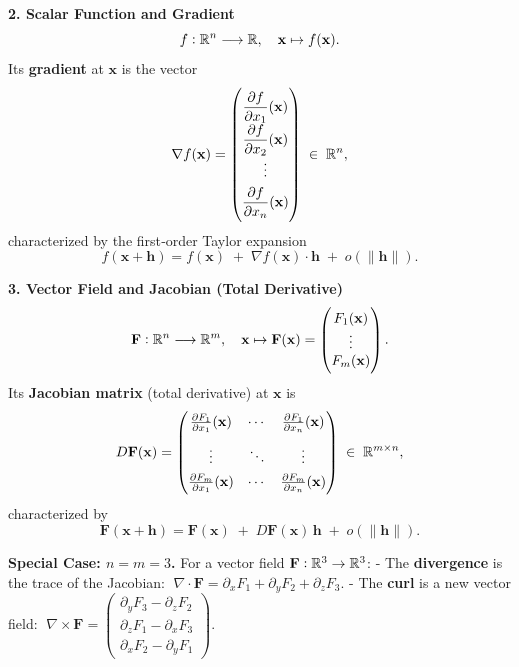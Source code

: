 \documentclass[11pt,openany]{article}
\renewcommand{\emph}[1]{\textbf{#1}}
\begin{document}
\noindent\textbf{2. Scalar Function and Gradient}  
\[
f:\mathbb{R}^n\longrightarrow\mathbb{R},
\quad
\mathbf x\mapsto f(\mathbf x).
\]
Its \emph{gradient} at \(\mathbf x\) is the vector
\[
\nabla f(\mathbf x)
=\begin{pmatrix}
	\displaystyle\frac{\partial f}{\partial x_1}(\mathbf x)\\[6pt]
	\displaystyle\frac{\partial f}{\partial x_2}(\mathbf x)\\[4pt]
	\vdots\\[4pt]
	\displaystyle\frac{\partial f}{\partial x_n}(\mathbf x)
\end{pmatrix}
\;\in\;\mathbb{R}^n,
\]
characterized by the first‐order Taylor expansion
\[
f(\mathbf x+\mathbf h)
= f(\mathbf x) \;+\;\nabla f(\mathbf x)\cdot\mathbf h\;+\;o(\|\mathbf h\|).
\]

\medskip

\noindent\textbf{3. Vector Field and Jacobian (Total Derivative)}  
\[
\mathbf F:\mathbb{R}^n\longrightarrow\mathbb{R}^m,
\quad
\mathbf x\mapsto \mathbf F(\mathbf x)
=\begin{pmatrix}F_1(\mathbf x)\\ \vdots\\ F_m(\mathbf x)\end{pmatrix}.
\]
Its \emph{Jacobian matrix} (total derivative) at \(\mathbf x\) is
\[
D\mathbf F(\mathbf x)
=\begin{pmatrix}
	\frac{\partial F_1}{\partial x_1}(\mathbf x) & \cdots & \frac{\partial F_1}{\partial x_n}(\mathbf x)\\[8pt]
	\vdots & \ddots & \vdots\\[4pt]
	\frac{\partial F_m}{\partial x_1}(\mathbf x) & \cdots & \frac{\partial F_m}{\partial x_n}(\mathbf x)
\end{pmatrix}
\;\in\;\mathbb{R}^{m\times n},
\]
characterized by
\[
\mathbf F(\mathbf x+\mathbf h)
= \mathbf F(\mathbf x) \;+\;D\mathbf F(\mathbf x)\,\mathbf h
\;+\;o(\|\mathbf h\|).
\]

\medskip

\noindent\textbf{Special Case: \(n=m=3\).}  
For a vector field \(\mathbf F:\mathbb{R}^3\to\mathbb{R}^3\):
- The \emph{divergence} is the trace of the Jacobian:  
\(\;\nabla\!\cdot\!\mathbf F
= \partial_x F_1 + \partial_y F_2 + \partial_z F_3\).  
- The \emph{curl} is a new vector field:  
\(\;\nabla\times\mathbf F
=\begin{pmatrix}
	\partial_y F_3 - \partial_z F_2\\
	\partial_z F_1 - \partial_x F_3\\
	\partial_x F_2 - \partial_y F_1
\end{pmatrix}.\)
\end{document}
